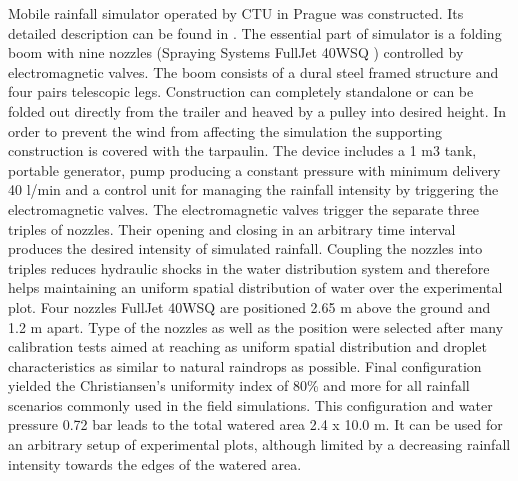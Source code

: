 Mobile rainfall simulator operated by CTU in Prague was constructed. Its detailed description can be found in \cite{EGUDS}. The essential part of simulator is a folding boom with nine nozzles (Spraying Systems FullJet 40WSQ \citep{Strauss2000})
controlled by electromagnetic valves. The boom consists of a dural steel framed structure and four pairs telescopic legs. Construction can completely standalone or can be folded out directly from the trailer and heaved by a pulley into desired height. In order to prevent the wind from affecting the simulation the supporting construction is covered with the tarpaulin.
The device includes a 1 m3 tank, portable generator, pump producing a constant pressure with minimum delivery 40 l/min and a control unit for managing the rainfall intensity by triggering the electromagnetic valves. The electromagnetic valves trigger the separate three triples of nozzles. Their opening and closing in an arbitrary time interval produces the desired intensity of simulated rainfall. Coupling the nozzles into triples reduces hydraulic shocks in the water distribution system and therefore helps maintaining an uniform spatial distribution of water over the experimental plot.
Four nozzles FullJet 40WSQ are positioned 2.65 m above the ground and 1.2 m apart. Type of the nozzles as well as the position were selected after many calibration tests aimed at reaching as uniform spatial distribution and droplet characteristics as similar to natural raindrops as possible. Final configuration yielded the Christiansen’s uniformity index \cite{Howell2003} of 80\% and more for all rainfall scenarios commonly used in the field simulations.
This configuration and water pressure 0.72 bar leads to the total watered area 2.4 x 10.0 m. It can be used for an arbitrary setup of experimental plots, although limited by a decreasing rainfall intensity towards the edges of the watered area.

